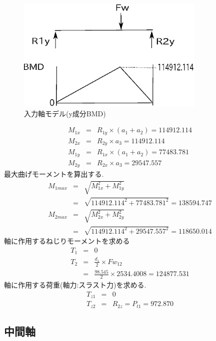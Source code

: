 \documentclass[a4j,twoside,openright,11pt]{jreport}
\begin{document}
\begin{figure}[htbp]
\begin{center}
\includegraphics[width=9cm]{jiku132.eps}
\end{center}
\caption{入力軸モデル(y成分BMD)}
\end{figure}
\begin{eqnarray}
M_{1x} &=& R_{1y} \times (a_1+a_2)=114912.114\\
M_{2x} &=& R_{2y} \times a_3=114912.114\\
M_{1y} &=& R_{1x} \times (a_1+a_2)=77483.781\\
M_{2y} &=& R_{2x} \times a_3=29547.557
\end{eqnarray}
最大曲げモーメントを算出する.
\begin{eqnarray}
M_{1max} &=& \sqrt {M_{1x}^2+M_{1y}^2}\\
         &=& \sqrt {114912.114^2+77483.781^2}=138594.747\\
M_{2max} &=& \sqrt {M_{2x}^2+M_{2y}^2}\\
         &=& \sqrt {114912.114^2+29547.557^2}=118650.014
\end{eqnarray}
軸に作用するねじりモーメントを求める
\begin{eqnarray}
T_{1} &=& 0\\
T_{2} &=& \frac{d_1}{2} \times Fw_{12}\\
      &=& \frac{98.545}{2} \times 2534.4008 = 124877.531
\end{eqnarray}
軸に作用する荷重(軸力:スラスト力)を求める.
\begin{eqnarray}
T_{z1} &=& 0\\
T_{z2} &=& R_{2z} = P_{t1} = 972.870
\end{eqnarray}




\subsection{中間軸}
\end{document}

